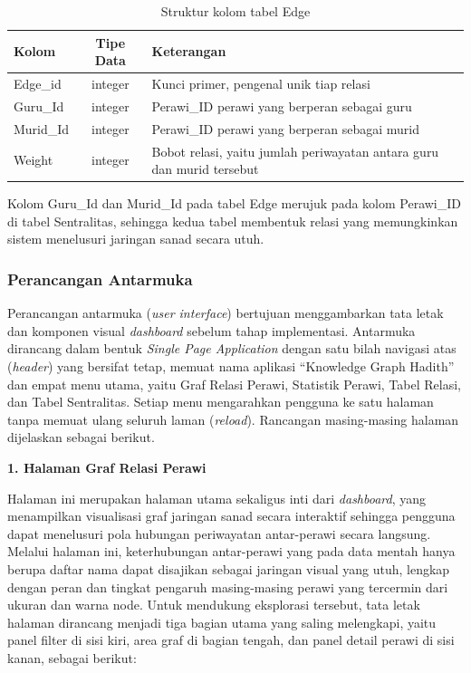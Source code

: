 \begin{table}[H]
\centering
\caption{Struktur kolom tabel Edge}
\label{tab:struktur-edge}
\renewcommand{\arraystretch}{1.3}
\begin{tabular}{|l|c|p{6.5cm}|}
\hline
\textbf{Kolom} & \textbf{Tipe Data} & \textbf{Keterangan} \\
\hline
Edge\_id & integer & Kunci primer, pengenal unik tiap relasi \\
\hline
Guru\_Id & integer & Perawi\_ID perawi yang berperan sebagai guru \\
\hline
Murid\_Id & integer & Perawi\_ID perawi yang berperan sebagai murid \\
\hline
Weight & integer & Bobot relasi, yaitu jumlah periwayatan antara guru dan murid tersebut \\
\hline
\end{tabular}
\end{table}

Kolom Guru\_Id dan Murid\_Id pada tabel Edge merujuk pada kolom Perawi\_ID di tabel Sentralitas, sehingga kedua tabel membentuk relasi yang memungkinkan sistem menelusuri jaringan sanad secara utuh.

\subsubsection{Perancangan Antarmuka}
Perancangan antarmuka (\textit{user interface}) bertujuan menggambarkan tata letak dan komponen visual \textit{dashboard} sebelum tahap implementasi. Antarmuka dirancang dalam bentuk \textit{Single Page Application} dengan satu bilah navigasi atas (\textit{header}) yang bersifat tetap, memuat nama aplikasi ``Knowledge Graph Hadith'' dan empat menu utama, yaitu Graf Relasi Perawi, Statistik Perawi, Tabel Relasi, dan Tabel Sentralitas. Setiap menu mengarahkan pengguna ke satu halaman tanpa memuat ulang seluruh laman (\textit{reload}). Rancangan masing-masing halaman dijelaskan sebagai berikut.

\noindent\textbf{1. Halaman Graf Relasi Perawi}

Halaman ini merupakan halaman utama sekaligus inti dari \textit{dashboard}, yang menampilkan visualisasi graf jaringan sanad secara interaktif sehingga pengguna dapat menelusuri pola hubungan periwayatan antar-perawi secara langsung. Melalui halaman ini, keterhubungan antar-perawi yang pada data mentah hanya berupa daftar nama dapat disajikan sebagai jaringan visual yang utuh, lengkap dengan peran dan tingkat pengaruh masing-masing perawi yang tercermin dari ukuran dan warna node. Untuk mendukung eksplorasi tersebut, tata letak halaman dirancang menjadi tiga bagian utama yang saling melengkapi, yaitu panel filter di sisi kiri, area graf di bagian tengah, dan panel detail perawi di sisi kanan, sebagai berikut:

